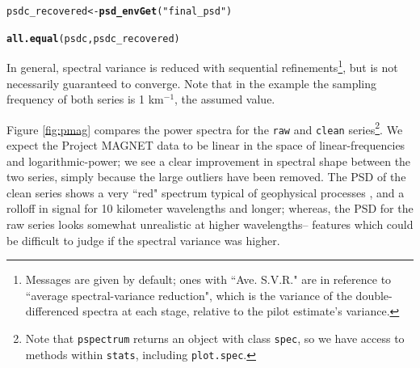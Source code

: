 \documentclass[10pt]{article}\usepackage[]{graphicx}\usepackage[]{color}
\makeatletter
\newcommand{\hlstr}[1]{\textcolor[rgb]{0.192,0.494,0.8}{#1}}%
\newcommand{\hlstd}[1]{\textcolor[rgb]{0.345,0.345,0.345}{#1}}%
\newcommand{\hlkwb}[1]{\textcolor[rgb]{0.69,0.353,0.396}{#1}}%
\newcommand{\hlkwd}[1]{\textcolor[rgb]{0.737,0.353,0.396}{\textbf{#1}}}%
\newenvironment{kframe}{%
 \def\at@end@of@kframe{}%
 \ifinner\ifhmode%
  \def\at@end@of@kframe{\end{minipage}}%
  \begin{minipage}{\columnwidth}%
 \fi\fi%
 \def\FrameCommand##1{\hskip\@totalleftmargin \hskip-\fboxsep
 \colorbox{shadecolor}{##1}\hskip-\fboxsep
     \hskip-\linewidth \hskip-\@totalleftmargin \hskip\columnwidth}%
 \MakeFramed {\advance\hsize-\width
   \@totalleftmargin\z@ \linewidth\hsize
   \@setminipage}}%
 {\par\unskip\endMakeFramed%
 \at@end@of@kframe}
\newenvironment{knitrout}{}{} %
\newcommand{\Rcmd}[1]{\texttt{#1}}
\makeatother
\begin{document}
\begin{knitrout}
\color{fgcolor}\begin{kframe}
\begin{alltt}
\hlstd{psdc_recovered} \hlkwb{<-} \hlkwd{psd_envGet}\hlstd{(}\hlstr{"final_psd"}\hlstd{)}
\end{alltt}


{\ttfamily\noindent{}}\begin{alltt}
\hlkwd{all.equal}\hlstd{(psdc, psdc_recovered)}
\end{alltt}


{\ttfamily\noindent\bfseries\color{errorcolor}{\#\# Error in all.equal(psdc, psdc\_recovered): object 'psdc' not found}}\end{kframe}
\end{knitrout}

In general, spectral variance is reduced
with sequential refinements\footnote{
Messages are given by default; ones with
``Ave. S.V.R."
are in reference to 
 ``average spectral-variance reduction", which
 is the variance of the
 double-differenced spectra at each stage, relative
 to the pilot estimate's variance.
}, but is not necessarily guaranteed to converge.
Note that in the example
the sampling frequency of both series
is 1 km$^{-1}$, the assumed value.

Figure \ref{fig:pmag} compares the 
power spectra for the \Rcmd{raw} and \Rcmd{clean} 
series\footnote{
Note that \Rcmd{pspectrum} returns
an object with class \Rcmd{spec}, so we have access to methods 
within \Rcmd{stats}, including \Rcmd{plot.spec}.
}.  
We expect the Project MAGNET data to be linear in the space of
linear-frequencies and logarithmic-power;
we see a clear
improvement in spectral shape between the two series,
simply because the large outliers have been removed.
The PSD of the clean series shows a
very ``red" spectrum typical of geophysical processes \citep{agnew1992},
and a rolloff in signal
for 10 kilometer wavelengths and longer; whereas, the 
PSD for the raw series looks somewhat unrealistic at higher wavelengths--
features which could be difficult to judge if the spectral variance was higher.
\end{document}
